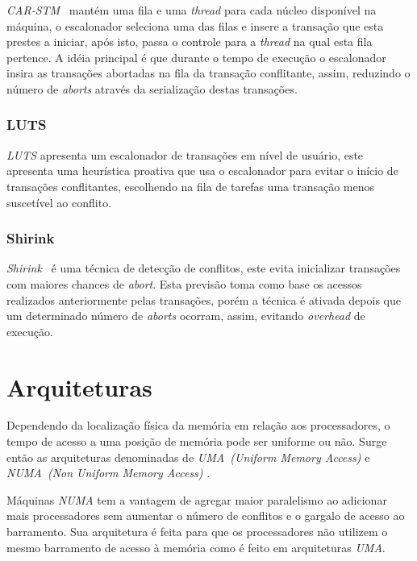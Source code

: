 \documentclass[diss,capa]{texufpel}
\begin{document}
\emph{CAR-STM}~\cite{carstm2008} mantém uma fila e uma \emph{thread} para cada núcleo disponível na máquina, o escalonador seleciona uma das filas e insere a transação que esta prestes a iniciar, após isto, passa o controle para a \emph{thread} na qual esta fila pertence. A idéia principal é que durante o tempo de execução o escalonador insira as transações abortadas na fila da transação conflitante, assim, reduzindo o número de \emph{aborts} através da serialização destas transações.

\subsection{LUTS}

\emph{LUTS} apresenta um escalonador de transações em nível de usuário, este apresenta uma heurística proativa que usa o escalonador para evitar o início de transações conflitantes, escolhendo na fila de tarefas uma transação menos suscetível ao conflito.

\subsection{Shirink}

\emph{Shirink}~\cite{shirink2009} é uma técnica de detecção de conflitos, este evita inicializar transações com maiores chances de \emph{abort}. Esta previsão toma como base os acessos realizados anteriormente pelas transações, porém a técnica é ativada depois que um determinado número de \emph{aborts} ocorram, assim, evitando \emph{overhead} de execução.

\chapter{Arquiteturas}
\label{chapter::arquiteturas}

Dependendo da localização física da memória em relação aos processadores, o tempo de acesso a uma posição de memória pode ser uniforme ou não. Surge então as arquiteturas denominadas de \emph{UMA~(Uniform Memory Access)} e \emph{NUMA~(Non Uniform Memory Access)} \cite{carissimi_2007}.

Máquinas \emph{NUMA} tem a vantagem de agregar maior paralelismo ao adicionar mais processadores sem aumentar o número de conflitos e o gargalo de acesso ao barramento. Sua arquitetura é feita para que os processadores não utilizem o mesmo barramento de acesso à memória como é feito em arquiteturas \emph{UMA}. %
\end{document}
